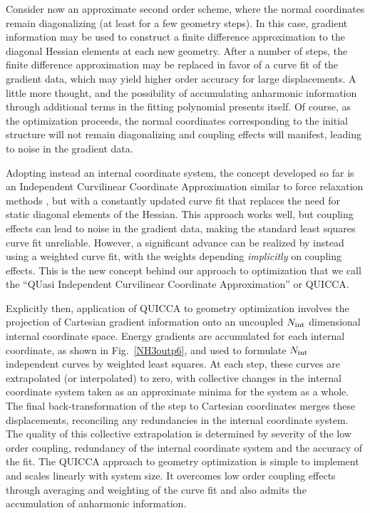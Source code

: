 \documentclass[prl,twocolumn,showpacs,twocolumngrid,superbib]{revtex4}
\begin{document}
Consider now an approximate second order scheme, where the normal coordinates remain 
diagonalizing (at least for a few geometry steps).  In this case, gradient information may 
be used to construct a finite difference approximation to the diagonal Hessian elements at 
each new geometry.  After a number of steps, the finite difference approximation may be 
replaced in favor of a curve fit of the gradient data, which may yield higher order 
accuracy for large displacements.  A little more thought, and the possibility of accumulating 
anharmonic information through additional terms in the fitting polynomial presents itself.  
Of course, as the optimization proceeds, the normal coordinates corresponding to the
initial structure will not remain diagonalizing and coupling effects will manifest, leading to 
noise in the gradient data.  

Adopting instead an internal coordinate system, the concept developed so far is an Independent 
Curvilinear Coordinate Approximation similar to force relaxation methods \cite{pulay,sellers}, but 
with a constantly updated  curve fit that replaces the need for static diagonal elements of the Hessian.
This approach works well, but coupling effects can lead to noise in the gradient data, making 
the standard least squares curve fit unreliable.  However, a significant advance can be
realized by instead using a weighted curve fit, with the weights depending {\em implicitly}
on coupling effects.   This is the new concept behind our approach to optimization that we 
call the ``QUasi Independent Curvilinear Coordinate Approximation'' or QUICCA. 

Explicitly then, application of QUICCA to geometry optimization involves the  projection of Cartesian 
gradient information onto an uncoupled $N_{\rm int}$ dimensional internal coordinate space.  Energy gradients 
are accumulated for each internal coordinate, as shown in Fig.~\ref{NH3outp6}, and used to formulate 
$N_{\rm int}$ independent curves by weighted least squares.  At each step, these curves are extrapolated 
(or interpolated) to zero, with collective changes in the internal coordinate system taken as an approximate 
minima for the system as a whole. The final back-transformation of the step to Cartesian coordinates merges 
these displacements, reconciling any redundancies in the internal coordinate system. The quality of this 
collective extrapolation is determined by severity of the low order coupling, redundancy of the internal 
coordinate system and the accuracy of the fit.  The QUICCA approach to geometry optimization is simple to 
implement and scales linearly with system size.  It overcomes low order coupling effects through averaging and 
weighting of the curve fit and also admits the accumulation of anharmonic information.  
\end{document}
